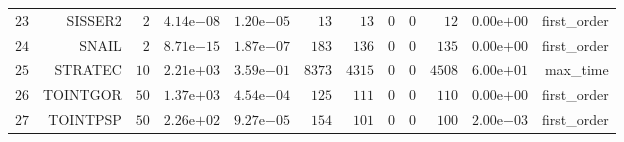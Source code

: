 \begin{longtable}{rrrrrrrrrrrr}
  \(    23\) & SISSER2 & \(     2\) & \( 4.14\)e\(-08\) & \( 1.20\)e\(-05\) & \(    13\) & \(    13\) & \(     0\) & \(     0\) & \(    12\) & \( 0.00\)e\(+00\) & first\_order \\
  \(    24\) & SNAIL & \(     2\) & \( 8.71\)e\(-15\) & \( 1.87\)e\(-07\) & \(   183\) & \(   136\) & \(     0\) & \(     0\) & \(   135\) & \( 0.00\)e\(+00\) & first\_order \\
  \(    25\) & STRATEC & \(    10\) & \( 2.21\)e\(+03\) & \( 3.59\)e\(-01\) & \(  8373\) & \(  4315\) & \(     0\) & \(     0\) & \(  4508\) & \( 6.00\)e\(+01\) & max\_time \\
  \(    26\) & TOINTGOR & \(    50\) & \( 1.37\)e\(+03\) & \( 4.54\)e\(-04\) & \(   125\) & \(   111\) & \(     0\) & \(     0\) & \(   110\) & \( 0.00\)e\(+00\) & first\_order \\
  \(    27\) & TOINTPSP & \(    50\) & \( 2.26\)e\(+02\) & \( 9.27\)e\(-05\) & \(   154\) & \(   101\) & \(     0\) & \(     0\) & \(   100\) & \( 2.00\)e\(-03\) & first\_order \\\hline
\end{longtable}
